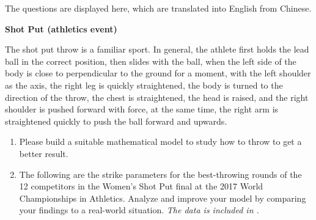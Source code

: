 \documentclass{article}
\begin{document}
\label{appendix:origin-questions}

The questions are displayed here, which are translated into English from Chinese.

\textbf{Shot Put (athletics event)}

The shot put throw is a familiar sport. In general, the athlete first holds the lead ball in the correct position, then slides with the ball, when the left side of the body is close to perpendicular to the ground for a moment, with the left shoulder as the axis, the right leg is quickly straightened, the body is turned to the direction of the throw, the chest is straightened, the head is raised, and the right shoulder is pushed forward with force, at the same time, the right arm is straightened quickly to push the ball forward and upwards.

\begin{enumerate}
    \item Please build a suitable mathematical model to study how to throw to get a better result.
    \item The following are the strike parameters for the best-throwing rounds of the 12 competitors in the Women's Shot Put final at the 2017 World Championships in Athletics. Analyze and improve your model by comparing your findings to a real-world situation.
    \hfill
    \textit{The data is included in \cite{IAAF2017WomensShotPut}.}
\end{enumerate}
\end{document}
